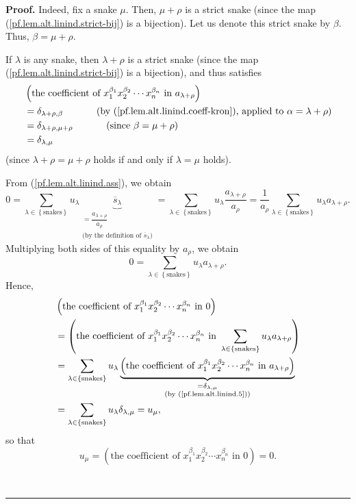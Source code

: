 \documentclass[numbers=enddot,12pt,final,onecolumn,notitlepage]{scrartcl}%
\theoremstyle{definition}
\newenvironment{proof}[1][Proof]{\noindent\textbf{#1.} }{\ \rule{0.5em}{0.5em}}
\let\sumnonlimits\sum
\renewcommand{\sum}{\sumnonlimits\limits}
\begin{document}
\begin{proof}
Indeed, fix a snake $\mu$. Then, $\mu+\rho$ is a strict snake (since the map
(\ref{pf.lem.alt.linind.strict-bij}) is a bijection). Let us denote this
strict snake by $\beta$. Thus, $\beta=\mu+\rho$.

If $\lambda$ is any snake, then $\lambda+\rho$ is a strict snake (since the
map (\ref{pf.lem.alt.linind.strict-bij}) is a bijection), and thus satisfies%
\begin{align}
&  \left(  \text{the coefficient of }x_{1}^{\beta_{1}}x_{2}^{\beta_{2}}\cdots
x_{n}^{\beta_{n}}\text{ in }a_{\lambda+\rho}\right) \nonumber\\
&  =\delta_{\lambda+\rho,\beta}\ \ \ \ \ \ \ \ \ \ \left(  \text{by
(\ref{pf.lem.alt.linind.coeff-kron}), applied to }\alpha=\lambda+\rho\right)
\nonumber\\
&  =\delta_{\lambda+\rho,\mu+\rho}\ \ \ \ \ \ \ \ \ \ \left(  \text{since
}\beta=\mu+\rho\right) \nonumber\\
&  =\delta_{\lambda,\mu} \label{pf.lem.alt.linind.5}%
\end{align}
(since $\lambda+\rho=\mu+\rho$ holds if and only if $\lambda=\mu$ holds).

From (\ref{pf.lem.alt.linind.ass}), we obtain%
\[
0=\sum_{\lambda\in\left\{  \text{snakes}\right\}  }u_{\lambda}%
\underbrace{\overline{s}_{\lambda}}_{\substack{=\dfrac{a_{\lambda+\rho}%
}{a_{\rho}}\\\text{(by the definition of }\overline{s}_{\lambda}\text{)}%
}}=\sum_{\lambda\in\left\{  \text{snakes}\right\}  }u_{\lambda}\dfrac
{a_{\lambda+\rho}}{a_{\rho}}=\dfrac{1}{a_{\rho}}\sum_{\lambda\in\left\{
\text{snakes}\right\}  }u_{\lambda}a_{\lambda+\rho}.
\]
Multiplying both sides of this equality by $a_{\rho}$, we obtain%
\[
0=\sum_{\lambda\in\left\{  \text{snakes}\right\}  }u_{\lambda}a_{\lambda+\rho
}.
\]
Hence,%
\begin{align*}
&  \left(  \text{the coefficient of }x_{1}^{\beta_{1}}x_{2}^{\beta_{2}}\cdots
x_{n}^{\beta_{n}}\text{ in }0\right) \\
&  =\left(  \text{the coefficient of }x_{1}^{\beta_{1}}x_{2}^{\beta_{2}}\cdots
x_{n}^{\beta_{n}}\text{ in }\sum_{\lambda\in\left\{  \text{snakes}\right\}
}u_{\lambda}a_{\lambda+\rho}\right) \\
&  =\sum_{\lambda\in\left\{  \text{snakes}\right\}  }u_{\lambda}%
\underbrace{\left(  \text{the coefficient of }x_{1}^{\beta_{1}}x_{2}%
^{\beta_{2}}\cdots x_{n}^{\beta_{n}}\text{ in }a_{\lambda+\rho}\right)
}_{\substack{=\delta_{\lambda,\mu}\\\text{(by (\ref{pf.lem.alt.linind.5}))}%
}}\\
&  =\sum_{\lambda\in\left\{  \text{snakes}\right\}  }u_{\lambda}%
\delta_{\lambda,\mu}=u_{\mu},
\end{align*}
so that%
\[
u_{\mu}=\left(  \text{the coefficient of }x_{1}^{\beta_{1}}x_{2}^{\beta_{2}%
}\cdots x_{n}^{\beta_{n}}\text{ in }0\right)  =0.
\]



\end{proof}
\end{document}
